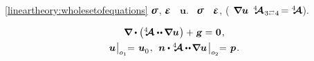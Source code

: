 

\label{section:equationsindisplacements.linearelasticity}
 
~\eqref{lineartheory:wholesetofequations}
$\linearstress$, $\infinitesimaldeformation$ ~$\bm{u}$.
~$\linearstress$
~$\infinitesimaldeformation$,
(~${\hspace{-0.2ex} \bm{\nabla}\hspace{-0.2ex} \bm{u}}$
 ${%
\stiffnesstensor_{\hspace{.12ex} \indexjuggling{3}{4}} \hspace{-0.25ex} = \stiffnesstensor%
}$).

\nopagebreak\vspace{-0.1em}
\begin{equation}\label{lineartheory:equationsindisplacements}
\begin{array}{c}
\boldnabla \dotp \left( \stiffnesstensor \dotdotp \hspace{-0.12ex} \boldnabla \bm{u} \hspace{.1ex} \right) + \hspace{.1ex} \volumeloadvector = \hspace{.1ex} \zerovector
\hspace{.16ex} , \\[.4em]
%
\bm{u} \hspace{.1ex} \bigr|_{o_1} \hspace{-0.64ex} = \hspace{.2ex} \bm{u}_{\raisemath{-0.1em}{0}}
\hspace{.16ex} , \:\:
\unitnormalvector \dotp %
\stiffnesstensor \hspace{-0.08ex} \dotdotp \hspace{-0.24ex} \boldnabla \bm{u}
\hspace{.25ex} \bigr|_{o_2} \hspace{-0.64ex} = \hspace{.2ex} \bm{p}
\hspace{.16ex} .
\end{array}
\end{equation}%

